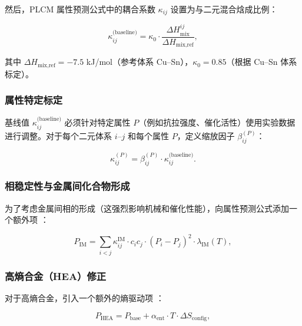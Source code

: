 \documentclass[12pt,a4paper]{article}
\begin{document}
	然后，PLCM 属性预测公式中的耦合系数 \(\kappa_{ij}\) 设置为与二元混合焓成比例：
	
	\begin{equation}
		\kappa_{ij}^{\text{(baseline)}} = \kappa_0 \cdot \frac{\Delta H_{\text{mix}}^{ij}}{\Delta H_{\text{mix,ref}}},
		\label{eq:kappa-miedema}
	\end{equation}
	
	其中 \(\Delta H_{\text{mix,ref}} = -7.5\) kJ/mol（参考体系 Cu–Sn），\(\kappa_0 = 0.85\)（根据 Cu–Sn 体系标定）。
	
	\subsubsection{属性特定标定}
	
	基线值 \(\kappa_{ij}^{\text{(baseline)}}\) 必须针对特定属性 \(P\)（例如抗拉强度、催化活性）使用实验数据进行调整。对于每个二元体系 \(i\)–\(j\) 和每个属性 \(P\)，定义缩放因子 \(\beta_{ij}^{(P)}\)：
	
	\begin{equation}
		\kappa_{ij}^{(P)} = \beta_{ij}^{(P)} \cdot \kappa_{ij}^{\text{(baseline)}}.
		\label{eq:beta-calibration}
	\end{equation}
	
	\subsubsection{相稳定性与金属间化合物形成}
	
	为了考虑金属间相的形成（这强烈影响机械和催化性能），向属性预测公式添加一个额外项 \cite{Wen2019}：
	
	\begin{equation}
		P_{\text{IM}} = \sum_{i<j} \kappa_{ij}^{\text{IM}} \cdot c_i c_j \cdot (P_i - P_j)^2 \cdot \lambda_{\text{IM}}(T),
		\label{eq:intermetallic}
	\end{equation}
	
	\subsubsection{高熵合金（HEA）修正}
	
	对于高熵合金，引入一个额外的熵驱动项 \cite{Wen2019, Yang2012}：
	
	\begin{equation}
		P_{\text{HEA}} = P_{\text{base}} + \alpha_{\text{ent}} \cdot T \cdot \Delta S_{\text{config}},
		\label{eq:hea}
	\end{equation}
	
\end{document}
